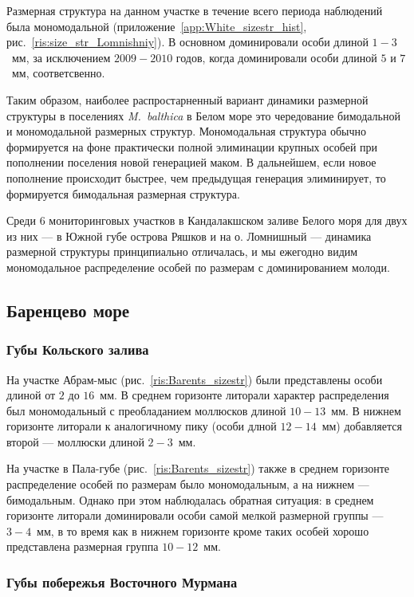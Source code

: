 Размерная структура на данном участке в течение всего периода наблюдений была мономодальной (приложение~\ref{app:White_sizestr_hist}, рис.~\ref{ris:size_str_Lomnishniy}).
В основном доминировали особи длиной $1-3$~мм, за исключением $2009-2010$ годов, когда доминировали особи длиной $5$ и $7$~мм, соответсвенно.


\bigskip
Таким образом, наиболее распростарненный вариант динамики размерной структуры в поселениях {\it M.~balthica} в Белом море это чередование бимодальной и мономодальной размерных структур.
Мономодальная структура обычно формируется на фоне практически полной элиминации крупных особей при пополнении поселения новой генерацией маком.
В дальнейшем, если новое пополнение происходит быстрее, чем предыдущая генерация элиминирует, то формируется бимодальная размерная структура.

Среди 6 мониторинговых участков в Кандалакшском заливе Белого моря для двух из них --- в Южной губе острова Ряшков и на о. Ломнишный --- динамика размерной структуры принципиально отличалась, и мы ежегодно видим мономодальное распределение особей по размерам с доминированием молоди.

		\subsection{Баренцево море}

		\subsubsection{Губы Кольского залива}

На участке Абрам-мыс (рис.~\ref{ris:Barents_sizestr}) были представлены особи длиной от $2$ до $16$~мм. 
В среднем горизонте литорали характер распределения был мономодальный с преобладанием моллюсков длиной $10-13$~мм. 
В нижнем горизонте литорали к аналогичному пику (особи длной $12-14$~мм) добавляется второй — моллюски длиной $2-3$~мм.

На участке в Пала-губе (рис.~\ref{ris:Barents_sizestr}) также в среднем горизонте распределение особей по размерам было мономодальным, а на нижнем --- бимодальным. 
Однако при этом наблюдалась обратная ситуация: в среднем горизонте литорали доминировали особи самой мелкой размерной группы --- $3-4$~мм, в то время как  в нижнем горизонте кроме таких особей  хорошо представлена размерная группа $10-12$~мм.

		\subsubsection{Губы побережья Восточного Мурмана}

